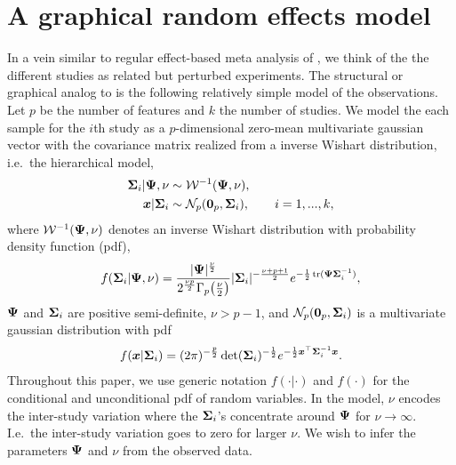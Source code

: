 \documentclass{article}\usepackage[]{graphicx}\usepackage[]{color}
\begin{document}
\section{A graphical random effects model}
In a vein similar to regular effect-based meta analysis of \citet{Choi2003}, we think of the the different studies as related but perturbed experiments. The structural or graphical analog to \citet{Choi2003} is the following relatively simple model of the observations.
Let $p$ be the number of features and $k$ the number of studies. We model the each sample for the $i$th study as a $p$-dimensional zero-mean multivariate gaussian vector with the covariance matrix realized from a inverse Wishart distribution, i.e.\ the hierarchical model,
\begin{align}
\begin{split} \label{eq:REM}
  {\boldsymbol{\Sigma}}_i | {\boldsymbol{\Psi}}, \nu  &\sim \mathcal{W}^{-1}({\boldsymbol{\Psi}}, \nu), \\
  \boldsymbol{x} | {\boldsymbol{\Sigma}}_i &\sim \mathcal{N}_p(\boldsymbol{0}_p, {\boldsymbol{\Sigma}}_i), \qquad i = 1, ..., k,
\end{split}
\end{align}
where $\mathcal{W}^{-1}({\boldsymbol{\Psi}}, \nu)$ denotes an inverse Wishart distribution with probability density function (pdf),
\begin{align*}
  f({\boldsymbol{\Sigma}}_i | {\boldsymbol{\Psi}}, \nu) =
  \frac{ |{\boldsymbol{\Psi}}|^\frac{\nu}{2} }{
        2^\frac{\nu p}{2} \Gamma_p\!\left( \frac{\nu}{2} \right) }
        |{\boldsymbol{\Sigma}}_i|^{-\frac{\nu+p+1}{2}}
  e^{-\frac{1}{2} \operatorname*{tr}({\boldsymbol{\Psi}}{\boldsymbol{\Sigma}}_i^{-1})},
\end{align*}
${\boldsymbol{\Psi}}$ and ${\boldsymbol{\Sigma}}_i$ are positive semi-definite, $\nu > p - 1$, and $\mathcal{N}_p(\boldsymbol{0}_p, {\boldsymbol{\Sigma}}_i)$ is a multivariate gaussian distribution with pdf
\begin{align*}
f(\boldsymbol{x} | {\boldsymbol{\Sigma}}_i) =
  (2\pi)^{-\frac{p}{2}} \det({\boldsymbol{\Sigma}}_i)^{-\frac{1}{2}}
  e^{ -\frac{1}{2}\boldsymbol{x}^\top {\boldsymbol{\Sigma}}_i^{-1}{\boldsymbol{x}} }.
\end{align*}
Throughout this paper, we use generic notation $f(\cdot | \cdot)$ and $f(\cdot)$ for the conditional and unconditional pdf of random variables.
In the model, $\nu$ encodes the inter-study variation where the ${\boldsymbol{\Sigma}}_i$'s concentrate around ${\boldsymbol{\Psi}}$ for $\nu\to\infty$. I.e.\ the inter-study variation goes to zero for larger $\nu$. We wish to infer the parameters ${\boldsymbol{\Psi}}$ and $\nu$ from the observed data.
\end{document}
